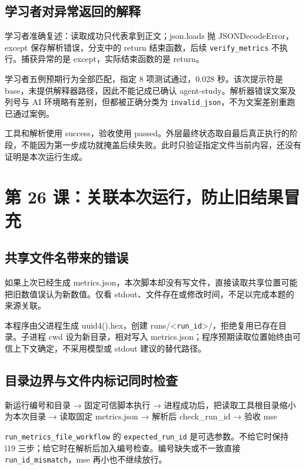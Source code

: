 \subsection{学习者对异常返回的解释}

学习者准确复述：读取成功只代表拿到正文；json.loads 抛 JSONDecodeError，except 保存解析错误，分支中的 return 结束函数，后续 \nolinkurl{verify_metrics} 不执行。捕获异常的是 except，实际结束函数的是 return。

学习者五例预期行为全部匹配，指定 8 项测试通过，0.028 秒。该次提示符是 base，未提供解释器路径，因此不能记成已确认 agent-study。解析器错误文案及列号与 AI 环境略有差别，但都被正确分类为 \nolinkurl{invalid_json}，不为文案差别重跑已通过案例。

工具和解析使用 success，验收使用 passed。外层最终状态取自最后真正执行的阶段，不能因为第一步成功就掩盖后续失败。此时只验证指定文件当前内容，还没有证明是本次运行生成。

\section{第 26 课：关联本次运行，防止旧结果冒充}

\subsection{共享文件名带来的错误}

如果上次已经生成 metrics.json，本次脚本却没有写文件，直接读取共享位置可能把旧数值误认为新数值。仅看 stdout、文件存在或修改时间，不足以完成本题的来源关联。

本程序由父进程生成 uuid4().hex，创建 runs/<\nolinkurl{run_id}>/，拒绝复用已存在目录。子进程 cwd 设为新目录，相对写入 metrics.json；程序预期读取位置始终由可信上下文确定，不采用模型或 stdout 建议的替代路径。

\subsection{目录边界与文件内标记同时检查}

\begin{Code}
新运行编号和目录
  → 固定可信脚本执行
  → 进程成功后，把读取工具根目录缩小为本次目录
  → 读取固定 metrics.json
  → 解析后 check_run_id
  → 验收 mse
\end{Code}

\nolinkurl{run_metrics_file_workflow} 的 \nolinkurl{expected_run_id} 是可选参数。不给它时保持 l19 三步；给它时在解析后加入编号检查。编号缺失或不一致直接 \nolinkurl{run_id_mismatch}，mse 再小也不继续放行。

